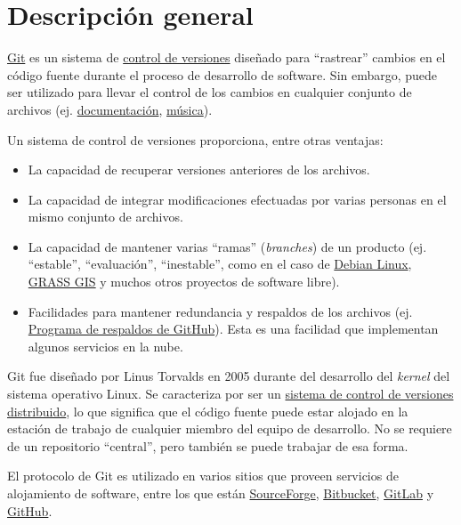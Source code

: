 \documentclass[
  letterpaper,
  DIV=11,
  numbers=noendperiod]{scrreprt}
\providecommand{\tightlist}{%
  \setlength{\itemsep}{0pt}\setlength{\parskip}{0pt}}\usepackage{longtable,booktabs,array}
\begin{document}
\hypertarget{descripciuxf3n-general-1}{%
\section{Descripción general}\label{descripciuxf3n-general-1}}

\href{https://git-scm.com/}{Git} es un sistema de
\href{https://es.wikipedia.org/wiki/Control_de_versiones}{control de
versiones} diseñado para ``rastrear'' cambios en el código fuente
durante el proceso de desarrollo de software. Sin embargo, puede ser
utilizado para llevar el control de los cambios en cualquier conjunto de
archivos (ej.
\href{https://guides.github.com/features/wikis/}{documentación},
\href{https://techcrunch.com/2013/10/09/splice-music/}{música}).

Un sistema de control de versiones proporciona, entre otras ventajas:

\begin{itemize}
\tightlist
\item
  La capacidad de recuperar versiones anteriores de los archivos.
\item
  La capacidad de integrar modificaciones efectuadas por varias personas
  en el mismo conjunto de archivos.
\item
  La capacidad de mantener varias ``ramas'' (\emph{branches}) de un
  producto (ej. ``estable'', ``evaluación'', ``inestable'', como en el
  caso de \href{https://www.debian.org/releases/}{Debian Linux},
  \href{https://grass.osgeo.org/download/software/sources/}{GRASS GIS} y
  muchos otros proyectos de software libre).
\item
  Facilidades para mantener redundancia y respaldos de los archivos (ej.
  \href{https://archiveprogram.github.com/}{Programa de respaldos de
  GitHub}). Esta es una facilidad que implementan algunos servicios en
  la nube.
\end{itemize}

Git fue diseñado por Linus Torvalds en 2005 durante del desarrollo del
\emph{kernel} del sistema operativo Linux. Se caracteriza por ser un
\href{https://es.wikipedia.org/wiki/Control_de_versiones_distribuido}{sistema
de control de versiones distribuido}, lo que significa que el código
fuente puede estar alojado en la estación de trabajo de cualquier
miembro del equipo de desarrollo. No se requiere de un repositorio
``central'', pero también se puede trabajar de esa forma.

El protocolo de Git es utilizado en varios sitios que proveen servicios
de alojamiento de software, entre los que están
\href{https://sourceforge.net/}{SourceForge},
\href{https://bitbucket.org/}{Bitbucket},
\href{https://about.gitlab.com/}{GitLab} y
\href{https://github.com/}{GitHub}.
\end{document}
